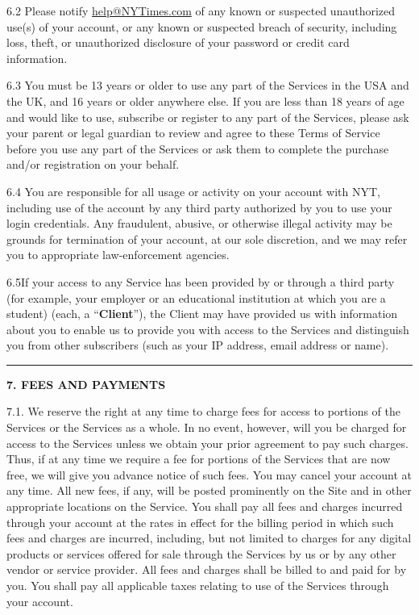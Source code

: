 6.2 Please notify \href{mailto:help@NYTimes.com}{help@NYTimes.com} of
any known or suspected unauthorized use(s) of your account, or any known
or suspected breach of security, including loss, theft, or unauthorized
disclosure of your password or credit card information.

6.3 You must be 13 years or older to use any part of the Services in the
USA and the UK, and 16 years or older anywhere else. If you are less
than 18 years of age and would like to use, subscribe or register to any
part of the Services, please ask your parent or legal guardian to review
and agree to these Terms of Service before you use any part of the
Services or ask them to complete the purchase and/or registration on
your behalf.

6.4 You are responsible for all usage or activity on your account with
NYT, including use of the account by any third party authorized by you
to use your login credentials. Any fraudulent, abusive, or otherwise
illegal activity may be grounds for termination of your account, at our
sole discretion, and we may refer you to appropriate law-enforcement
agencies.

6.5If your access to any Service has been provided by or through a third
party (for example, your employer or an educational institution at which
you are a student) (each, a ``\textbf{Client}''), the Client may have
provided us with information about you to enable us to provide you with
access to the Services and distinguish you from other subscribers (such
as your IP address, email address or name).~

\begin{center}\rule{0.5\linewidth}{\linethickness}\end{center}

\textbf{7. FEES AND PAYMENTS}

7.1. We reserve the right at any time to charge fees for access to
portions of the Services or the Services as a whole. In no event,
however, will you be charged for access to the Services unless we obtain
your prior agreement to pay such charges. Thus, if at any time we
require a fee for portions of the Services that are now free, we will
give you advance notice of such fees. You may cancel your account at any
time. All new fees, if any, will be posted prominently on the Site and
in other appropriate locations on the Service. You shall pay all fees
and charges incurred through your account at the rates in effect for the
billing period in which such fees and charges are incurred, including,
but not limited to charges for any digital products or services offered
for sale through the Services by us or by any other vendor or service
provider. All fees and charges shall be billed to and paid for by you.
You shall pay all applicable taxes relating to use of the Services
through your account.

